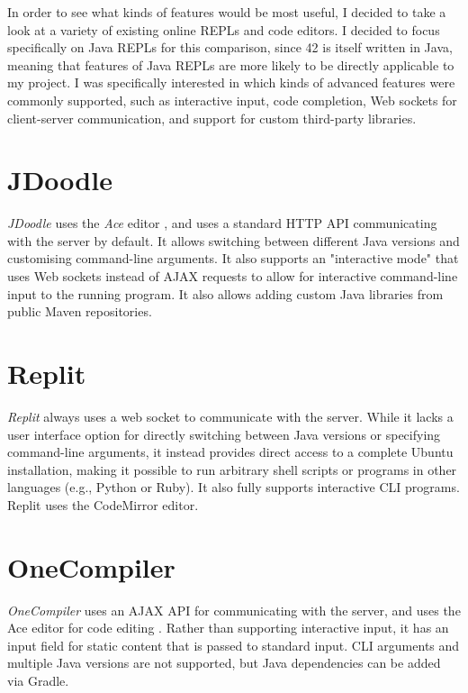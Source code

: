In order to see what kinds of features would be most useful, I decided to take a look at a variety of existing online REPLs and code editors. I decided to focus specifically on Java REPLs for this comparison, since 42 is itself written in Java, meaning that features of Java REPLs are more likely to be directly applicable to my project. I was specifically interested in which kinds of advanced features were commonly supported, such as interactive input, code completion, Web sockets for client-server communication, and support for custom third-party libraries.

\section{JDoodle}

\emph{JDoodle} \cite{nutpan-pty-ltd-2022} uses the \emph{Ace} editor \cite{mozilla-2022}, and uses a standard HTTP API communicating with the server by default. It allows switching between different Java versions and customising command-line arguments. It also supports an "interactive mode" that uses Web sockets instead of AJAX requests to allow for interactive command-line input to the running program. It also allows adding custom Java libraries from public Maven repositories.


\section{Replit}

\emph{Replit} \cite{replit-2022} always uses a web socket to communicate with the server. While it lacks a user interface option for directly switching between Java versions or specifying command-line arguments, it instead provides direct access to a complete Ubuntu installation, making it possible to run arbitrary shell scripts or programs in other languages (e.g., Python or Ruby). It also fully supports interactive CLI programs. Replit uses the CodeMirror editor.


\section{OneCompiler}

\emph{OneCompiler} uses an AJAX API for communicating with the server, and uses the Ace editor for code editing \cite{one-compiler-pvt-ltd-2022}. Rather than supporting interactive input, it has an input field for static content that is passed to standard input. CLI arguments and multiple Java versions are not supported, but Java dependencies can be added via Gradle.

